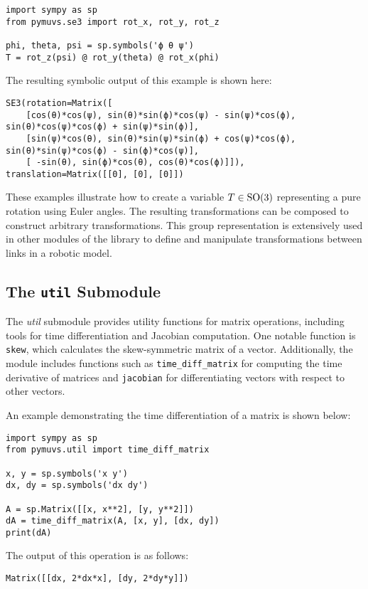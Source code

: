 \begin{lstlisting}[style=custompython,
    caption={Creating a rotation matrix from euler angles.},
    label={lst:usage:se30}]
import sympy as sp
from pymuvs.se3 import rot_x, rot_y, rot_z

phi, theta, psi = sp.symbols('ϕ θ ψ')
T = rot_z(psi) @ rot_y(theta) @ rot_x(phi)
\end{lstlisting}

The resulting symbolic output of this example is shown here:

\begin{lstlisting}[style=customtxt,
    caption={Output of \autoref{lst:codegen}.},
    label={lst:usage:se3}]
SE3(rotation=Matrix([
    [cos(θ)*cos(ψ), sin(θ)*sin(ϕ)*cos(ψ) - sin(ψ)*cos(ϕ), sin(θ)*cos(ψ)*cos(ϕ) + sin(ψ)*sin(ϕ)],
    [sin(ψ)*cos(θ), sin(θ)*sin(ψ)*sin(ϕ) + cos(ψ)*cos(ϕ), sin(θ)*sin(ψ)*cos(ϕ) - sin(ϕ)*cos(ψ)],
    [ -sin(θ), sin(ϕ)*cos(θ), cos(θ)*cos(ϕ)]]),
translation=Matrix([[0], [0], [0]])
\end{lstlisting}

These examples illustrate how to create a variable $T \in \operatorname{SO}(3)$ representing a pure rotation using Euler angles. The resulting transformations can be composed to construct arbitrary transformations. This group representation is extensively used in other modules of the library to define and manipulate transformations between links in a robotic model.



\subsection{The \texttt{util} Submodule}

The \emph{util} submodule provides utility functions for matrix operations, including tools for time differentiation and Jacobian computation. One notable function is \texttt{skew}, which calculates the skew-symmetric matrix of a vector. Additionally, the module includes functions such as \texttt{time\_diff\_matrix} for computing the time derivative of matrices and \texttt{jacobian} for differentiating vectors with respect to other vectors.

An example demonstrating the time differentiation of a matrix is shown below:

\begin{lstlisting}[style=custompython,
    caption={Time differentiation of a matrix.},
    label={lst:usage:util:time_diff_matrix}]
import sympy as sp
from pymuvs.util import time_diff_matrix

x, y = sp.symbols('x y')
dx, dy = sp.symbols('dx dy')

A = sp.Matrix([[x, x**2], [y, y**2]])
dA = time_diff_matrix(A, [x, y], [dx, dy])
print(dA)
\end{lstlisting}
The output of this operation is as follows:
\begin{lstlisting}[style=customtxt,
    caption={Output of \autoref{lst:usage:util:time_diff_matrix}.},
    label={lst:usage:util:time_diff_matrix:out}]
Matrix([[dx, 2*dx*x], [dy, 2*dy*y]])
\end{lstlisting}

